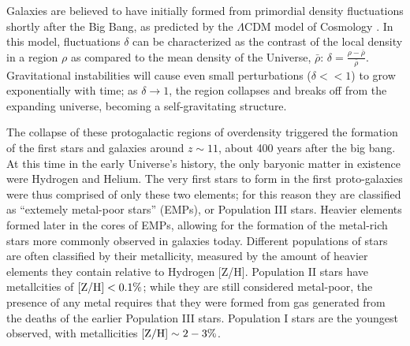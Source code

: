 Galaxies are believed to have initially formed from primordial density fluctuations shortly after the Big Bang, as predicted by the $\Lambda$CDM model of Cosmology \citep{Peebles1994,Ryden2006,Conselice2012,Silk2013}. In this model, fluctuations $\delta$ can be characterized as the contrast of the local density in a region $\rho$ as compared to the mean density of the Universe, $\bar{\rho}$: $\delta = \frac{\rho - \bar{\rho}}{\bar{\rho}}$. Gravitational instabilities will cause even small perturbations ($\delta<<1$) to grow exponentially with time; as $\delta \rightarrow 1$, the region collapses and breaks off from the expanding universe, becoming a self-gravitating structure.

The collapse of these protogalactic regions of overdensity triggered the formation of the first stars and galaxies around $z\sim11$, about 400 years after the big bang. At this time in the early Universe's history, the only baryonic matter in existence were Hydrogen and Helium. The very first stars to form in the first proto-galaxies were thus comprised of only these two elements; for this reason they are classified as ``extemely metal-poor stars'' (EMPs), or Population III stars. Heavier elements formed later in the cores of EMPs, allowing for the formation of the metal-rich stars more commonly observed in galaxies today. Different populations of stars are often classified by their metallicity, measured by the amount of heavier elements they contain relative to Hydrogen [Z/H]. Population II stars have metallcities of $\rm [Z/H] < 0.1 \%$; while they are still considered metal-poor, the presence of any metal requires that they were formed from gas generated from the deaths of the earlier Population III stars. Population I stars are the youngest observed, with metallicities $\rm [Z/H] \sim 2-3\%$. 

